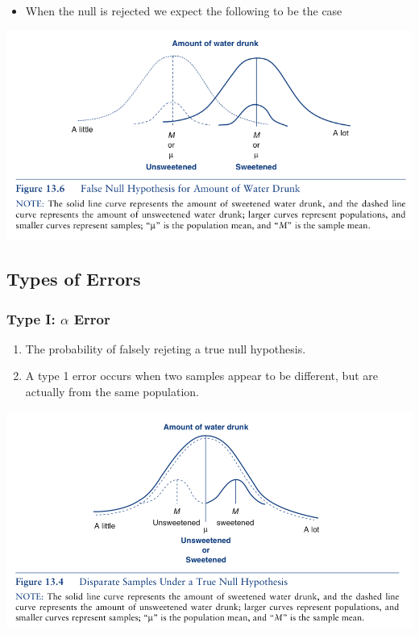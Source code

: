 \documentclass[]{article}
\begin{document}
\begin{itemize}
\itemsep1pt\parskip0pt
\item
  When the null is rejected we expect the following to be the case
\end{itemize}

\includegraphics{error2.png}

\subsection{Types of Errors}\label{types-of-errors-1}

\subsubsection{Type I: $\alpha$ Error}\label{type-i-alpha-error}

\begin{enumerate}
\def\labelenumi{\arabic{enumi}.}
\itemsep1pt\parskip0pt
\item
  The probability of falsely rejeting a true null hypothesis.
\item
  A type 1 error occurs when two samples appear to be different, but are
  actually from the same population.
\end{enumerate}

\includegraphics{type1.png}
\end{document}
